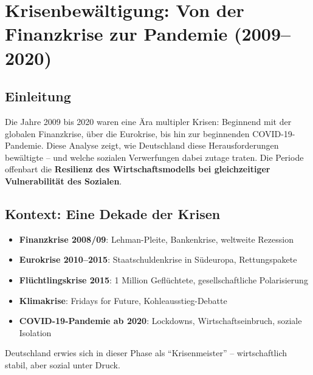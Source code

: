 \chapter{Krisenbewältigung: Von der Finanzkrise zur Pandemie (2009–2020)}
\label{chap:krisenbewaeltigung}

\section*{Einleitung}
Die Jahre 2009 bis 2020 waren eine Ära multipler Krisen: Beginnend mit der globalen Finanzkrise, über die Eurokrise, bis hin zur beginnenden
COVID-19-Pandemie. Diese Analyse zeigt, wie Deutschland diese Herausforderungen bewältigte – und welche sozialen Verwerfungen dabei zutage traten.
Die Periode offenbart die \textbf{Resilienz des Wirtschaftsmodells bei gleichzeitiger Vulnerabilität des Sozialen}.

\section{Kontext: Eine Dekade der Krisen}

\begin{itemize}
    \item \textbf{Finanzkrise 2008/09}: Lehman-Pleite, Bankenkrise, weltweite Rezession
    \item \textbf{Eurokrise 2010–2015}: Staatschuldenkrise in Südeuropa, Rettungspakete
    \item \textbf{Flüchtlingskrise 2015}: 1 Million Geflüchtete, gesellschaftliche Polarisierung
    \item \textbf{Klimakrise}: Fridays for Future, Kohleausstieg-Debatte
    \item \textbf{COVID-19-Pandemie ab 2020}: Lockdowns, Wirtschaftseinbruch, soziale Isolation
\end{itemize}

Deutschland erwies sich in dieser Phase als \enquote{Krisenmeister} – wirtschaftlich stabil, aber sozial unter Druck.

